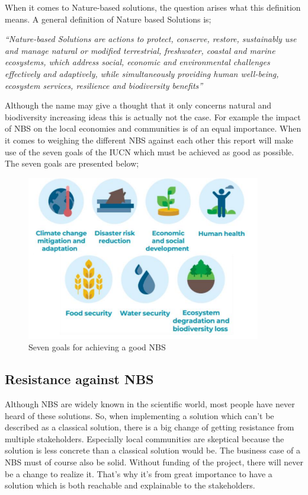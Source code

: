 When it comes to Nature-based solutions, the question arises what this definition means. A general definition of Nature based Solutions is;

\textit{“Nature-based Solutions are actions to protect, conserve, restore, sustainably
use and manage natural or modified terrestrial, freshwater, coastal and marine
ecosystems, which address social, economic and environmental challenges
effectively and adaptively, while simultaneously providing human well-being,
ecosystem services, resilience and biodiversity benefits” \autocite{eiselinVerenigdeNatiesStemmen2022}}

Although the name may give a thought that it only concerns natural and biodiversity increasing ideas this is actually not the case. For example the impact of NBS on the local economies and communities is of an equal importance. When it comes to weighing the different NBS against each other this report will make use of the seven goals of the IUCN which must be achieved as good as possible. The seven goals are presented below;

\begin{figure}[H]
    \centering
    \includegraphics[width=0.50\linewidth]{figures/ThesevenNBSgoals.png}
    \caption{Seven goals for achieving a good NBS \autocite{dunlopEvolutionFutureResearch}}
    \label{fig:7g}
\end{figure}

\subsection{Resistance against NBS}

Although NBS are widely known in the scientific world, most people have never heard of these solutions. So, when implementing a solution which can't be described as a classical solution, there is a big change of getting resistance from multiple stakeholders. Especially local communities are skeptical because the solution is less concrete than a classical solution would be. The business case of a NBS must of course also be solid. Without funding of the project, there will never be a change to realize it. That's why it's from great importance to have a solution which is both reachable and explainable to the stakeholders. 

